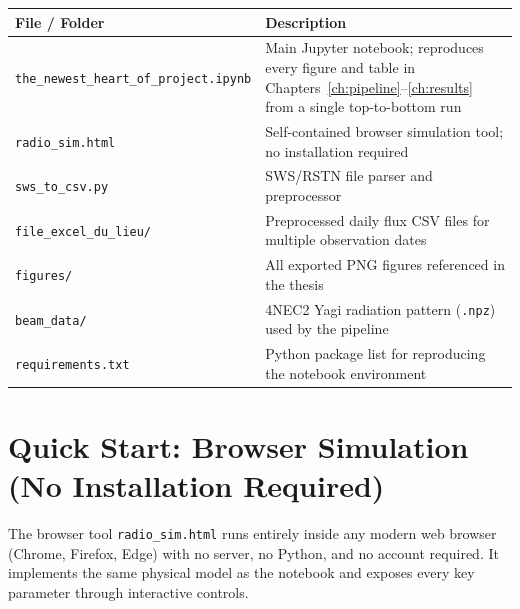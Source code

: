 \begin{center}
\renewcommand{\arraystretch}{1.3}
\begin{tabularx}{\textwidth}{l >{\raggedright\arraybackslash}X}
  \toprule
  \textbf{File / Folder} & \textbf{Description} \\
  \midrule
  \texttt{the\_newest\_heart\_of\_project.ipynb}
    & Main Jupyter notebook; reproduces every figure and table in
      Chapters~\ref{ch:pipeline}--\ref{ch:results} from a single top-to-bottom run \\
  \texttt{radio\_sim.html}
    & Self-contained browser simulation tool; no installation required \\
  \texttt{sws\_to\_csv.py}
    & SWS/RSTN file parser and preprocessor \\
  \texttt{file\_excel\_du\_lieu/}
    & Preprocessed daily flux CSV files for multiple observation dates \\
  \texttt{figures/}
    & All exported PNG figures referenced in the thesis \\
  \texttt{beam\_data/}
    & 4NEC2 Yagi radiation pattern (\texttt{.npz}) used by the pipeline \\
  \texttt{requirements.txt}
    & Python package list for reproducing the notebook environment \\
  \bottomrule
\end{tabularx}
\end{center}

\section{Quick Start: Browser Simulation (No Installation Required)}
\label{sec:appx-html}

The browser tool \texttt{radio\_sim.html} runs entirely inside any modern web
browser (Chrome, Firefox, Edge) with no server, no Python, and no account
required. It implements the same physical model as the notebook and exposes
every key parameter through interactive controls.

